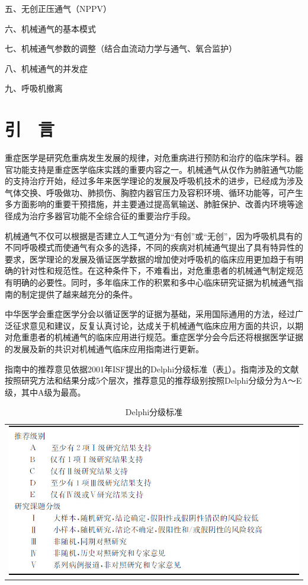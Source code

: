 五、无创正压通气（NPPV）

六、机械通气的基本模式

七、机械通气参数的调整（结合血流动力学与通气、氧合监护）

八、机械通气的并发症

九、呼吸机撤离

\section{引　言}

重症医学是研究危重病发生发展的规律，对危重病进行预防和治疗的临床学科。器官功能支持是重症医学临床实践的重要内容之一。机械通气从仅作为肺脏通气功能的支持治疗开始，经过多年来医学理论的发展及呼吸机技术的进步，已经成为涉及气体交换、呼吸做功、肺损伤、胸腔内器官压力及容积环境、循环功能等，可产生多方面影响的重要干预措施，并主要通过提高氧输送、肺脏保护、改善内环境等途径成为治疗多器官功能不全综合征的重要治疗手段。

机械通气不仅可以根据是否建立人工气道分为“有创”或“无创”，因为呼吸机具有的不同呼吸模式而使通气有众多的选择，不同的疾病对机械通气提出了具有特异性的要求，医学理论的发展及循证医学数据的增加使对呼吸机的临床应用更加趋于有明确的针对性和规范性。在这种条件下，不难看出，对危重患者的机械通气制定规范有明确的必要性。同时，多年临床工作的积累和多中心临床研究证据为机械通气指南的制定提供了越来越充分的条件。

中华医学会重症医学分会以循证医学的证据为基础，采用国际通用的方法，经过广泛征求意见和建议，反复认真讨论，达成关于机械通气临床应用方面的共识，以期对危重患者的机械通气的临床应用进行规范。重症医学分会今后还将根据医学证据的发展及新的共识对机械通气临床应用指南进行更新。

指南中的推荐意见依据2001年ISF提出的Delphi分级标准（表\ref{tabapp-3}）。指南涉及的文献按照研究方法和结果分成5个层次，推荐意见的推荐级别按照Delphi分级分为A～E级，其中A级为最高。
　
\begin{longtable}{c}
  \caption{Delphi分级标准}
  \label{tabapp-3}
  \endfirsthead
  \caption[]{Delphi分级标准}
  \endhead
\includegraphics[width=\textwidth,height=\textheight,keepaspectratio]{./images/Image00301.jpg}
\end{longtable}

